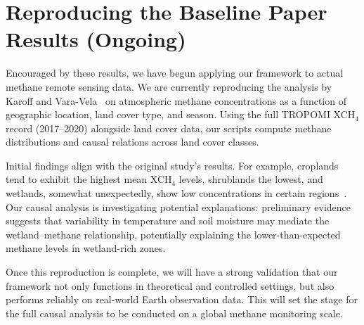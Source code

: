 \section{Reproducing the Baseline Paper Results (Ongoing)}
Encouraged by these results, we have begun applying our framework to actual methane remote sensing data. We are currently reproducing the analysis by Karoff and Vara-Vela~\cite{Karoff2023} on atmospheric methane concentrations as a function of geographic location, land cover type, and season. Using the full TROPOMI XCH$_4$ record (2017–2020) alongside land cover data, our scripts compute methane distributions and causal relations across land cover classes.

Initial findings align with the original study’s results. For example, croplands tend to exhibit the highest mean XCH$_4$ levels, shrublands the lowest, and wetlands, somewhat unexpectedly, show low concentrations in certain regions~\cite{Karoff2023}. Our causal analysis is investigating potential explanations: preliminary evidence suggests that variability in temperature and soil moisture may mediate the wetland–methane relationship, potentially explaining the lower-than-expected methane levels in wetland-rich zones.

Once this reproduction is complete, we will have a strong validation that our framework not only functions in theoretical and controlled settings, but also performs reliably on real-world Earth observation data. This will set the stage for the full causal analysis to be conducted on a global methane monitoring scale.

